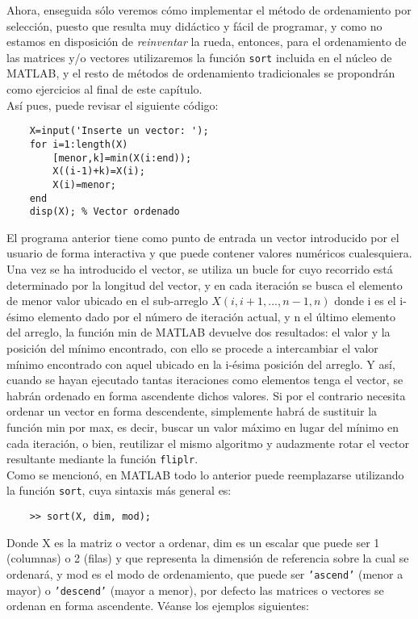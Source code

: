 Ahora, enseguida sólo veremos cómo implementar el método de ordenamiento por selección, 
puesto que resulta muy didáctico y fácil de programar, y como no estamos en disposición 
de \textit{reinventar} la rueda,  entonces, para el ordenamiento de las matrices y/o vectores 
utilizaremos la función \texttt{sort} incluida en el núcleo de MATLAB, y el resto de métodos de 
ordenamiento tradicionales se propondrán como ejercicios al final de este capítulo.\\

Así pues, puede revisar el siguiente código:

\begin{verbatim}
	X=input('Inserte un vector: ');
	for i=1:length(X)
	    [menor,k]=min(X(i:end));
	    X((i-1)+k)=X(i);
	    X(i)=menor;
	end
	disp(X); % Vector ordenado
\end{verbatim}

El programa anterior tiene como punto de entrada un vector introducido por el usuario de 
forma interactiva y que puede contener valores numéricos cualesquiera. Una vez se ha 
introducido el vector, se utiliza un bucle for cuyo recorrido está determinado por la 
longitud del vector, y en cada iteración se busca el elemento de menor valor ubicado en 
el sub-arreglo $X(i,i+1,...,n-1,n)$ donde i es el i-ésimo elemento dado por el 
número de iteración actual, y n el último elemento del arreglo, la función min de MATLAB 
devuelve dos resultados: el valor y la posición del mínimo encontrado, con ello se procede 
a intercambiar el valor mínimo encontrado con aquel ubicado en la i-ésima posición del 
arreglo. Y así, cuando se hayan ejecutado tantas iteraciones como elementos tenga el vector, 
se habrán ordenado en forma ascendente dichos valores. Si por el contrario necesita ordenar 
un vector en forma descendente, simplemente habrá de sustituir la función min por max, 
es decir, buscar un valor máximo en lugar del mínimo en cada iteración, o bien, reutilizar 
el mismo algoritmo y audazmente rotar el vector resultante mediante la función \texttt{fliplr}.\\

Como se mencionó, en MATLAB todo lo anterior puede reemplazarse utilizando la función \texttt{sort}, 
cuya sintaxis más general es:

\begin{verbatim}
	>> sort(X, dim, mod);
\end{verbatim}

Donde X es la matriz o vector a ordenar, dim es un escalar que puede ser 1 (columnas) 
o 2 (filas) y que representa la dimensión de referencia sobre la cual se ordenará, 
y mod es el modo de ordenamiento, que puede ser \texttt{'ascend'} (menor a mayor) o \texttt{'descend'} 
(mayor a menor), por defecto las matrices o vectores se ordenan en forma ascendente. 
Véanse los ejemplos siguientes:

